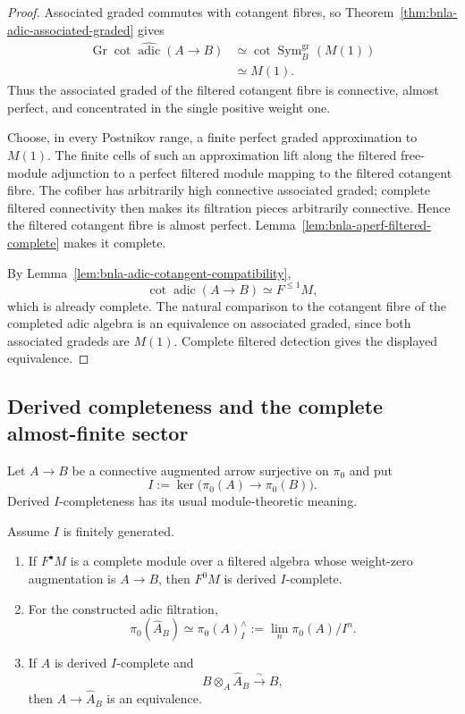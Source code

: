 \begin{proof}
Associated graded commutes with cotangent fibres, so
Theorem~\ref{thm:bnla-adic-associated-graded} gives
\[
\begin{aligned}
    \operatorname{Gr}
    \operatorname{cot}
    \widehat{\operatorname{adic}}(A\to B)
    &\simeq
    \operatorname{cot}
    \operatorname{Sym}^{\mathrm{gr}}_B(M(1))
    \\
    &\simeq
    M(1).
\end{aligned}
\]
Thus the associated graded of the filtered cotangent fibre is connective,
almost perfect, and concentrated in the single positive weight one.

Choose, in every Postnikov range, a finite perfect graded approximation to
$M(1)$.  The finite cells of such an approximation lift along the filtered
free-module adjunction to a perfect filtered module mapping to the filtered
cotangent fibre.  The cofiber has arbitrarily high connective associated
graded; complete filtered connectivity then makes its filtration pieces
arbitrarily connective.  Hence the filtered cotangent fibre is almost
perfect.  Lemma~\ref{lem:bnla-aperf-filtered-complete} makes it complete.

By Lemma~\ref{lem:bnla-adic-cotangent-compatibility},
\[
    \operatorname{cot}\operatorname{adic}(A\to B)
    \simeq
    F^{\leq1}M,
\]
which is already complete.  The natural comparison to the cotangent fibre of
the completed adic algebra is an equivalence on associated graded, since both
associated gradeds are $M(1)$.  Complete filtered detection gives the
displayed equivalence.
\end{proof}

\subsection{Derived completeness and the complete almost-finite sector}

Let $A\to B$ be a connective augmented arrow surjective on $\pi_0$ and put
\[
    I:=\ker\bigl(\pi_0(A)\to\pi_0(B)\bigr).
\]
Derived $I$-completeness has its usual module-theoretic meaning.

\begin{lemma}
\label{lem:bnla-filtered-derived-completion}
Assume $I$ is finitely generated.
\begin{enumerate}
    \item If $F^\bullet M$ is a complete module over a filtered algebra whose
    weight-zero augmentation is $A\to B$, then $F^0M$ is derived
    $I$-complete.
    \item For the constructed adic filtration,
    \[
    \boxed{
        \pi_0(\widehat A_B)
        \simeq
        \pi_0(A)^\wedge_I
        :=
        \lim_n\pi_0(A)/I^n.}
    \]
    \item If $A$ is derived $I$-complete and
    \[
        B\otimes_A\widehat A_B\xrightarrow{\sim}B,
    \]
    then $A\to\widehat A_B$ is an equivalence.
\end{enumerate}
\end{lemma}

